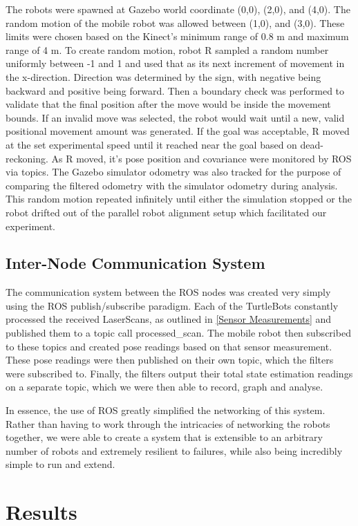 \documentclass[conference]{IEEEtran} \usepackage[T1]{fontenc} \usepackage[backend=biber, style=ieee]{biblatex}
\begin{document}
The robots were spawned at Gazebo world coordinate (0,0), (2,0), and (4,0). The random motion of the mobile robot was
allowed between (1,0), and (3,0). These limits were chosen based on the Kinect's minimum range of 0.8 m and maximum range 
of 4 m. To create random motion, robot R sampled a random number uniformly between -1 and 1 and used that as its next increment
of movement in the x-direction. Direction was determined by the sign, with negative being backward and positive being forward. 
Then a boundary check was performed to validate that the final position after the move would be inside the movement bounds. 
If an invalid move was selected, the robot would wait until a new, valid positional movement amount was generated. If 
the goal was acceptable, R moved at the set experimental speed until it reached near the goal based on dead-reckoning. As R
moved, it's pose position and covariance were monitored by ROS via topics. The Gazebo simulator odometry was also tracked 
for the purpose of comparing the filtered odometry with the simulator odometry during analysis. This random motion repeated infinitely 
until either the simulation stopped or the robot drifted out of the parallel robot alignment setup which facilitated our experiment.

\subsection{Inter-Node Communication System} \label{Inter-Node Communication System} The communication system between
the ROS nodes was created very simply using the ROS publish/subscribe paradigm. Each of the TurtleBots constantly
processed the received LaserScans, as outlined in \ref{Sensor Measurements} and published them to a topic call
processed\_scan. The mobile robot then subscribed to these topics and created pose readings based on that sensor
measurement. These pose readings were then published on their own topic, which the filters were subscribed to. 
Finally, the filters output their total state estimation readings on a separate topic, which we were then able to
record, graph and analyse.

In essence, the use of ROS greatly simplified the networking of this system. Rather than having to work through the
intricacies of networking the robots together, we were able to create a system that is extensible to an arbitrary number
of robots and extremely resilient to failures, while also being incredibly simple to run and extend.

\section{Results} \label{Results} %
\end{document}
